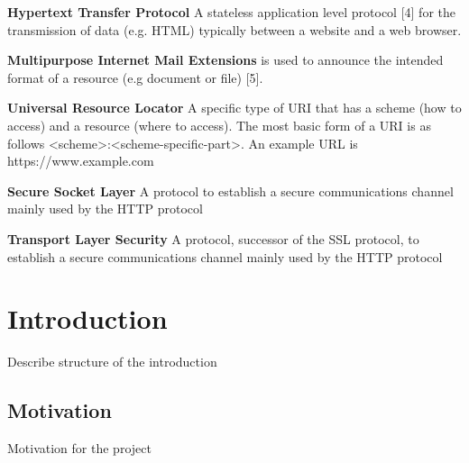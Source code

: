 \documentclass{mscreport}
\begin{document}
\begin{hangparas}{.25in}{1}
\textbf{Hypertext Transfer Protocol} A stateless application level protocol [4] for the transmission of data (e.g. HTML) typically between a website and a web browser. \par
\vspace{0.5cm}
\textbf{Multipurpose Internet Mail Extensions} is used to announce the intended format of a resource (e.g document or file) [5]. \par
\vspace{0.5cm}
\textbf{Universal Resource Locator} A specific type of URI that has a scheme (how to access) and a resource (where to access). The most basic form of a URI is as follows <scheme>:<scheme-specific-part>. An example URL is https://www.example.com \par
\vspace{0.5cm}
\textbf{Secure Socket Layer} A protocol to establish a secure communications channel mainly used by the HTTP protocol \par
\vspace{0.5cm}
\textbf{Transport Layer Security} A protocol, successor of the SSL protocol, to establish a secure communications channel mainly used by the HTTP protocol \par

\end{hangparas}



\newpage

\listoffigures

\newpage
{}
\listoftables

\newpage




\tableofcontents

\newpage

\section{Introduction}

Describe structure of the introduction

\subsection{Motivation}

Motivation for the project
\end{document}
